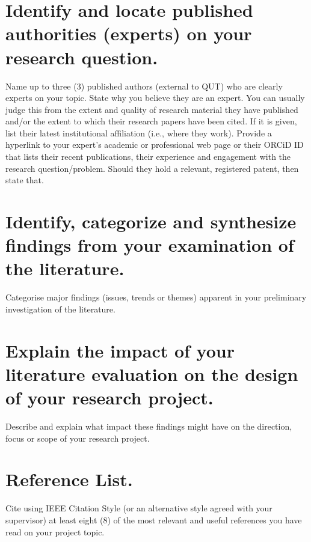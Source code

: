 \documentclass[12pt, a4paper]{article}
\begin{document}
\section*{Identify and locate published authorities (experts) on your research question.}
Name up to three (3) published authors (external to QUT) who are clearly experts on your topic. State why you believe they are an expert. You can usually judge this from the extent and quality of research material they have published and/or the extent to which their research papers have been cited. If it is given, list their latest institutional affiliation (i.e., where they work). Provide a hyperlink to your expert's academic or professional web page or their ORCiD ID that lists their recent publications, their experience and engagement with the research question/problem. Should they hold a relevant, registered patent, then state that.
\vspace{3cm}

\section*{Identify, categorize and synthesize findings from your examination of the literature.}
Categorise major findings (issues, trends or themes) apparent in your preliminary investigation of the literature.
\vspace{3cm}

\section*{Explain the impact of your literature evaluation on the design of your research project.}
Describe and explain what impact these findings might have on the direction, focus or scope of your research project.
\vspace{3cm}

\section*{Reference List.}
Cite using IEEE Citation Style (or an alternative style agreed with your supervisor) at least eight (8) of the most relevant and useful references you have read on your project topic.
\end{document}

